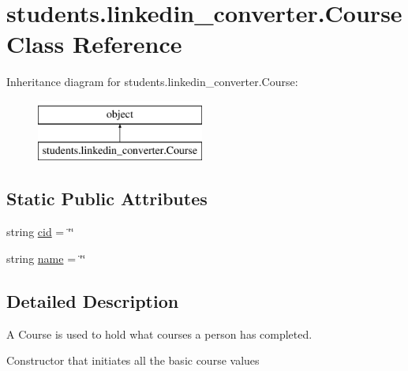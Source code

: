 \hypertarget{classstudents_1_1linkedin__converter_1_1_course}{\section{students.\-linkedin\-\_\-converter.\-Course Class Reference}
\label{classstudents_1_1linkedin__converter_1_1_course}
}
Inheritance diagram for students.\-linkedin\-\_\-converter.\-Course\-:\begin{figure}[H]
\begin{center}
\leavevmode
\includegraphics[height=2.000000cm]{classstudents_1_1linkedin__converter_1_1_course}
\end{center}
\end{figure}
\subsection*{Static Public Attributes}
\begin{DoxyCompactItemize}
\item 
string \hyperlink{classstudents_1_1linkedin__converter_1_1_course_a61b6dbcb8128298f44fafc413667c418}{cid} = \char`\"{}\char`\"{}
\item 
string \hyperlink{classstudents_1_1linkedin__converter_1_1_course_a086c26e2a7267f59ebf1ed12aa03344c}{name} = \char`\"{}\char`\"{}
\end{DoxyCompactItemize}


\subsection{Detailed Description}
\begin{DoxyVerb}A Course is used to hold what courses a person has completed.\end{DoxyVerb}
\begin{DoxyVerb}Constructor that initiates all the basic course values\end{DoxyVerb}
 

